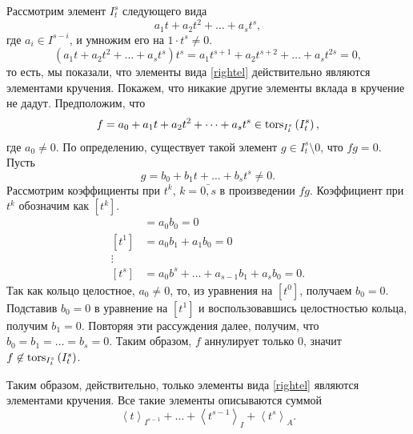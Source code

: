     \begin{Proof}
        Рассмотрим элемент $I^s_t$ следующего вида 
        \begin{equation} \label{rightel}
            a_1t + a_2t^2 + \dots + a_st^s,
        \end{equation}
        где $a_i \in I^{s - i}$, и умножим его на $1\cdot t^s \neq 0$.
        \begin{equation*}
            (a_1t + a_2t^2 + \dots + a_st^s)t^s = a_1t^{s + 1} + a_2t^{s + 2} + \dots + a_st^{2s} = 0,
        \end{equation*}
        то есть, мы показали, что элементы вида \eqref{rightel} действительно являются элементами кручения.
        Покажем, что никакие другие элементы вклада в кручение не дадут. Предположим, что
        \begin{equation*} 
            f = a_0 + a_1t + a_2t^2 + \dots + a_st^s \in \textup{tors}_{I^s_t}\left(I^s_t\right),
        \end{equation*}
        где $a_0 \neq 0$. По определению, существует такой элемент $g \in I^s_t \setminus 0$, что
        $fg = 0.$
        Пусть 
        \begin{equation*}
            g = b_0 + b_1t + \dots + b_st^s \neq 0.
        \end{equation*}
        Рассмотрим коэффициенты при $t^k$, $k = \bar{0, s}$ в произведении $fg$. Коэффициент при $t^k$ обозначим как $[t^k]$.
        \begin{align*}
            [t^0] &= a_0b_0 = 0\\
            [t^1] &= a_0b_1 + a_1b_0 = 0\\
            \vdots\\
            [t^s] &= a_0b^s + \dots + a_{s-1}b_1 + a_sb_0 = 0.
        \end{align*}
        Так как кольцо целостное, $a_0 \neq 0$, то, из уравнения на $[t^0]$, получаем $b_0 = 0$. Подставив
        $b_0 = 0$ в уравнение на $[t^1]$ и воспользовавшись целостностью кольца, получим $b_1 = 0$. Повторяя 
        эти рассуждения далее, получим, что $b_0 = b_1 = \dots = b_s = 0$. Таким образом, $f$ аннулирует 
        только 0, значит $f \not \in \textup{tors}_{I^s_t}\left(I^s_t\right)$. 

        Таким образом, действительно, только элементы вида \eqref{rightel} являются элементами кручения.
        Все такие элементы описываются суммой 
        \begin{equation*}
            \left< t \right>_{I^{s-1}} + 
            \dots +
            \left< t^{s-1} \right>_{I} + 
            \left< t^s \right>_A.
        \end{equation*}
    \end{Proof}